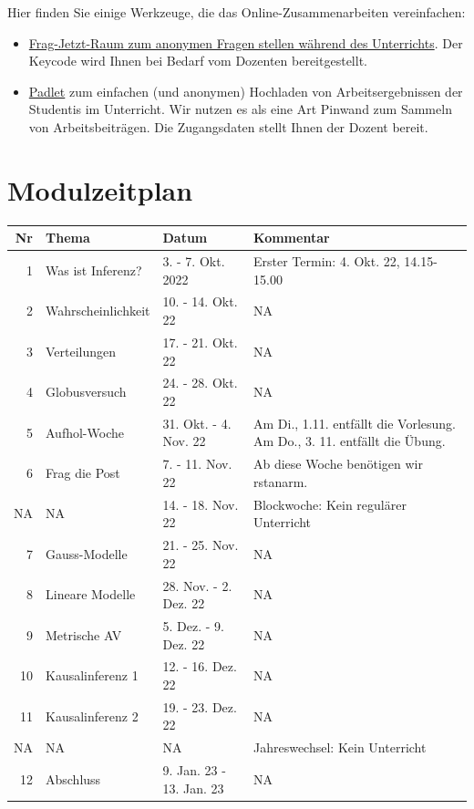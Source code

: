 \documentclass[
  a4paper,
  DIV=11]{scrreprt}
\providecommand{\tightlist}{%
  \setlength{\itemsep}{0pt}\setlength{\parskip}{0pt}}\usepackage{longtable,booktabs,array}
\theoremstyle{definition}
\theoremstyle{remark}
\begin{document}
Hier finden Sie einige Werkzeuge, die das Online-Zusammenarbeiten
vereinfachen:

\begin{itemize}
\tightlist
\item
  \href{https://frag.jetzt/home}{Frag-Jetzt-Raum zum anonymen Fragen
  stellen während des Unterrichts}. Der Keycode wird Ihnen bei Bedarf
  vom Dozenten bereitgestellt.
\item
  \href{https://de.padlet.com/}{Padlet} zum einfachen (und anonymen)
  Hochladen von Arbeitsergebnissen der Studentis im Unterricht. Wir
  nutzen es als eine Art Pinwand zum Sammeln von Arbeitsbeiträgen. Die
  Zugangsdaten stellt Ihnen der Dozent bereit.
\end{itemize}

\hypertarget{modulzeitplan}{%
\section*{Modulzeitplan}\label{modulzeitplan}}

\begin{longtable}{rlll}
\toprule
Nr & Thema & Datum & Kommentar \\ 
\midrule
1 & Was ist Inferenz? & 3. - 7. Okt. 2022 & Erster Termin: 4. Okt. 22, 14.15-15.00 \\ 
2 & Wahrscheinlichkeit & 10. - 14. Okt. 22 & NA \\ 
3 & Verteilungen & 17. - 21. Okt. 22 & NA \\ 
4 & Globusversuch & 24. - 28. Okt. 22 & NA \\ 
5 & Aufhol-Woche & 31. Okt. - 4. Nov. 22 & Am Di., 1.11. entfällt die Vorlesung. Am Do., 3. 11. entfällt die Übung. \\ 
6 & Frag die Post & 7. - 11. Nov. 22 & Ab diese Woche benötigen wir rstanarm. \\ 
NA & NA & 14. - 18. Nov. 22 & Blockwoche: Kein regulärer Unterricht \\ 
7 & Gauss-Modelle & 21. - 25. Nov. 22 & NA \\ 
8 & Lineare Modelle & 28. Nov. - 2. Dez. 22 & NA \\ 
9 & Metrische AV & 5. Dez. - 9. Dez. 22 & NA \\ 
10 & Kausalinferenz 1 & 12. - 16. Dez. 22 & NA \\ 
11 & Kausalinferenz 2 & 19. - 23. Dez. 22 & NA \\ 
NA & NA & NA & Jahreswechsel: Kein Unterricht \\ 
12 & Abschluss & 9. Jan. 23 - 13. Jan. 23 & NA \\ 
\bottomrule
\end{longtable}
\end{document}

